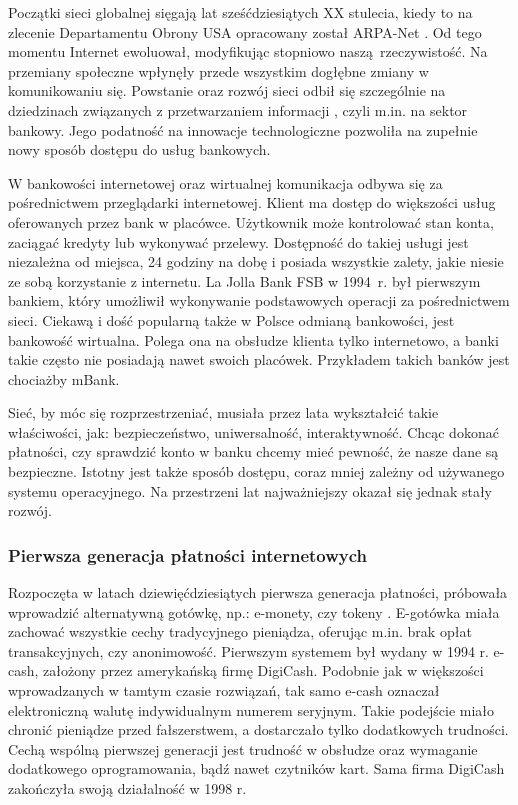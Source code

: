 Początki sieci globalnej sięgają lat sześćdziesiątych XX stulecia, kiedy to na zlecenie Departamentu Obrony USA opracowany został ARPA-Net \cite{pieniadz_elektroniczny-analiza}. Od tego momentu Internet ewoluował, modyfikując stopniowo naszą rzeczywistość. Na przemiany społeczne wpłynęły przede wszystkim dogłębne zmiany w komunikowaniu się. Powstanie oraz rozwój sieci odbił się szczególnie na dziedzinach związanych z przetwarzaniem informacji \cite{pieniadz_elektroniczny-analiza}, czyli m.in. na sektor bankowy. Jego podatność na innowacje technologiczne pozwoliła na zupełnie nowy sposób dostępu do usług bankowych.

W bankowości internetowej oraz wirtualnej komunikacja odbywa się za pośrednictwem przeglądarki internetowej. Klient ma dostęp do większości usług oferowanych przez bank w placówce. Użytkownik może kontrolować stan konta, zaciągać kredyty lub wykonywać przelewy. Dostępność do takiej usługi jest niezależna od miejsca, 24 godziny na dobę i posiada wszystkie zalety, jakie niesie ze sobą korzystanie z internetu. La Jolla Bank FSB w 1994~r. był pierwszym bankiem, który umożliwił wykonywanie podstawowych operacji za pośrednictwem sieci. Ciekawą i dość popularną także w Polsce odmianą bankowości, jest bankowość wirtualna. Polega ona na obsłudze klienta tylko internetowo, a banki takie często nie posiadają nawet swoich placówek. Przykładem takich banków jest chociażby mBank. 

Sieć, by móc się rozprzestrzeniać, musiała przez lata wykształcić takie właściwości, jak: bezpieczeństwo, uniwersalność, interaktywność. Chcąc dokonać płatności, czy sprawdzić konto w banku chcemy mieć pewność, że nasze dane są bezpieczne. Istotny jest także sposób dostępu, coraz mniej zależny od używanego systemu operacyjnego. Na przestrzeni lat najważniejszy okazał się jednak stały rozwój. 

\subsubsection*{Pierwsza generacja płatności internetowych}

Rozpoczęta w latach dziewięćdziesiątych pierwsza generacja płatności, próbowała wprowadzić alternatywną gotówkę, np.: e-monety, czy tokeny \cite{elektroniczne_metody_platnosci}. E-gotówka miała zachować wszystkie cechy tradycyjnego pieniądza, oferując m.in. brak opłat transakcyjnych, czy anonimowość. Pierwszym systemem był wydany w 1994 r. e-cash, założony przez amerykańską firmę DigiCash. Podobnie jak w większości wprowadzanych w tamtym czasie rozwiązań, tak samo e-cash oznaczał elektroniczną walutę indywidualnym numerem seryjnym. Takie podejście miało chronić pieniądze przed fałszerstwem, a dostarczało tylko dodatkowych trudności. Cechą wspólną pierwszej generacji jest trudność w obsłudze oraz wymaganie dodatkowego oprogramowania, bądź nawet czytników kart. Sama firma DigiCash zakończyła swoją działalność w 1998 r.

